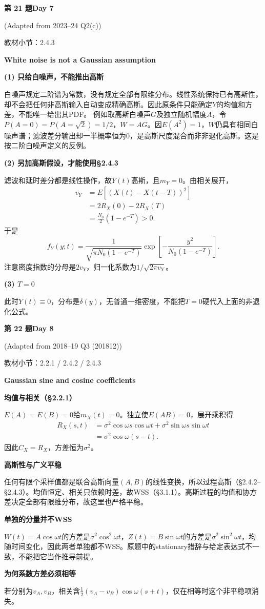 \documentclass[10.5pt,fontset=fandol]{ctexart}
\newcommand{\key}[1]{\par\vspace{4pt}\noindent\textbf{\color{navy}#1}\par\vspace{2pt}}
\newcommand{\qtitle}[2]{\par\addvspace{1.2em}\Needspace{8\baselineskip}\begin{tcolorbox}[colback=navy,colframe=navy,arc=1.5pt,boxrule=0pt]\color{white}\large\bfseries #1\hfill\small #2\end{tcolorbox}}
\begin{document}
\qtitle{第 21 题}{Day 7}
{\small\color{accentred}(Adapted from 2023--24 Q2(c))}\par\smallskip
{\small\color{muted}教材小节：2.4.3}\par\medskip
\noindent\textbf{White noise is not a Gaussian assumption}\par\smallskip\begin{tcolorbox}[breakable,colback=qbg,colframe=qbg,boxrule=0pt]\key{(1) 只给白噪声，不能推出高斯}
白噪声规定二阶谱为常数，没有规定全部有限维分布。线性系统保持已有高斯性，却不会把任何非高斯输入自动变成精确高斯。因此原条件只能确定$Y$的均值和方差，不能唯一给出其PDF。
例如取高斯白噪声$G$及独立随机幅度$A$，令$P(A=0)=P(A=\sqrt2)=1/2$，$W=AG$。因$E(A^2)=1$，$W$仍具有相同白噪声谱；滤波差分输出却一半概率恒为0，是高斯尺度混合而非非退化高斯。这是按二阶白噪声定义的反例。
\key{(2) 另加高斯假设，才能使用§2.4.3}
滤波和延时差分都是线性操作，故$Y(t)$高斯，且$m_Y=0$。由相关展开，
\[\begin{aligned}v_Y&=E[(X(t)-X(t-T))^2]\\&=2R_X(0)-2R_X(T)\\&=\boxed{\frac{N_0}{2}(1-e^{-T})}>0.\end{aligned}\]
于是
\[\boxed{f_Y(y;t)=\frac1{\sqrt{\pi N_0(1-e^{-T})}}\exp\!\left[-\frac{y^2}{N_0(1-e^{-T})}\right].}\]
注意密度指数的分母是$2v_Y$，归一化系数为$1/\sqrt{2\pi v_Y}$。
\key{(3) $T=0$}
此时$Y(t)\equiv0$，分布是$\delta(y)$，无普通一维密度，不能把$T=0$硬代入上面的非退化公式。

\end{tcolorbox}
\qtitle{第 22 题}{Day 8}
{\small\color{accentred}(Adapted from 2018--19 Q3 (201812))}\par\smallskip
{\small\color{muted}教材小节：2.2.1 / 2.4.2 / 2.4.3}\par\medskip
\noindent\textbf{Gaussian sine and cosine coefficients}\par\smallskip\begin{tcolorbox}[breakable,colback=qbg,colframe=qbg,boxrule=0pt]\key{均值与相关（§2.2.1）}
$E(A)=E(B)=0$给$m_X(t)=0$。独立使$E(AB)=0$，展开乘积得
\[\begin{aligned}R_X(s,t)&=\sigma^2\cos\omega s\cos\omega t+\sigma^2\sin\omega s\sin\omega t\\&=\boxed{\sigma^2\cos\omega(s-t)}.\end{aligned}\]
因此$C_X=R_X$，方差恒为$\sigma^2$。
\key{高斯性与广义平稳}
任何有限个采样值都是联合高斯向量$(A,B)$的线性变换，所以过程高斯（§2.4.2--§2.4.3）。均值恒定、相关只依赖时差，故WSS（§3.1.1）。高斯过程的均值和协方差决定全部有限维分布，故这里也严格平稳。
\key{单独的分量并不WSS}
$W(t)=A\cos\omega t$的方差是$\sigma^2\cos^2\omega t$，$Z(t)=B\sin\omega t$的方差是$\sigma^2\sin^2\omega t$，均随时间变化，因此两者单独都不WSS。原题中的stationary措辞与给定表达式不一致，不能把它当作推导前提。
\key{为何系数方差必须相等}
若分别为$v_A,v_B$，相关含$\tfrac12(v_A-v_B)\cos\omega(s+t)$，仅在相等时这个非平稳项消失。
\end{tcolorbox}
\end{document}
